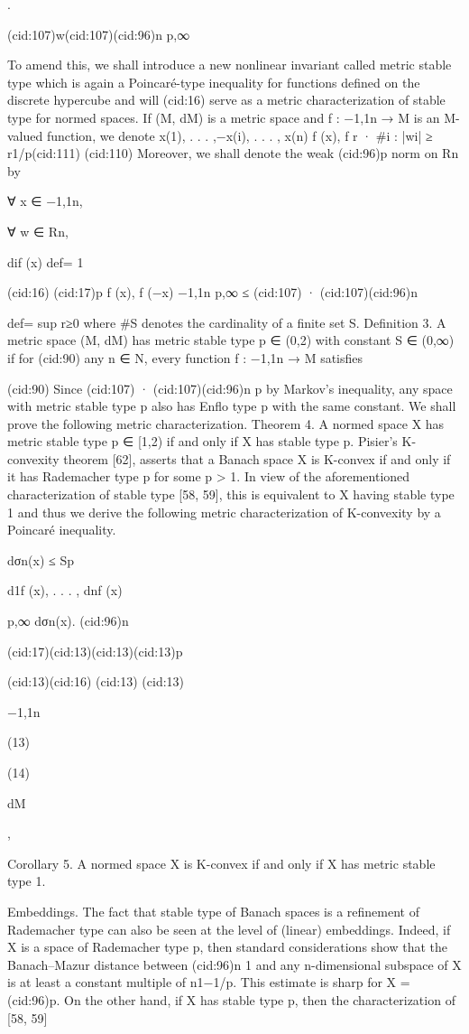 .

(cid:107)w(cid:107)(cid:96)n
p,∞

To amend this, we shall introduce a new nonlinear invariant called metric stable type which
is again a Poincaré-type inequality for functions deﬁned on the discrete hypercube and will
(cid:16)
serve as a metric characterization of stable type for normed spaces. If (M, dM) is a metric space
and f : {−1,1}n → M is an M-valued function, we denote
x(1), . . . ,−x(i), . . . , x(n)
f (x), f
r · #{i : |wi| ≥ r}1/p(cid:111)
(cid:110)
Moreover, we shall denote the weak (cid:96)p norm on Rn by

∀ x ∈ {−1,1}n,

∀ w ∈ Rn,

dif (x) def= 1

(cid:16)
(cid:17)p
f (x), f (−x)
{−1,1}n
p,∞ ≤ (cid:107) · (cid:107)(cid:96)n

def= sup
r≥0
where #S denotes the cardinality of a ﬁnite set S.
Deﬁnition 3. A metric space (M, dM) has metric stable type p ∈ (0,2) with constant S ∈ (0,∞) if for
(cid:90)
any n ∈ N, every function f : {−1,1}n → M satisﬁes

(cid:90)
Since (cid:107) · (cid:107)(cid:96)n
p by Markov’s inequality, any space with metric stable type p also has
Enﬂo type p with the same constant. We shall prove the following metric characterization.
Theorem 4. A normed space X has metric stable type p ∈ [1,2) if and only if X has stable type p.
Pisier’s K-convexity theorem [62], asserts that a Banach space X is K-convex if and only
if it has Rademacher type p for some p > 1. In view of the aforementioned characterization
of stable type [58, 59], this is equivalent to X having stable type 1 and thus we derive the
following metric characterization of K-convexity by a Poincaré inequality.

dσn(x) ≤ Sp

d1f (x), . . . , dnf (x)

p,∞ dσn(x).
(cid:96)n

(cid:17)(cid:13)(cid:13)(cid:13)p

(cid:13)(cid:16)
(cid:13)
(cid:13)

{−1,1}n

(13)

(14)

dM

,

Corollary 5. A normed space X is K-convex if and only if X has metric stable type 1.

Embeddings. The fact that stable type of Banach spaces is a reﬁnement of Rademacher type
can also be seen at the level of (linear) embeddings. Indeed, if X is a space of Rademacher type
p, then standard considerations show that the Banach–Mazur distance between (cid:96)n
1 and any
n-dimensional subspace of X is at least a constant multiple of n1−1/p. This estimate is sharp
for X = (cid:96)p. On the other hand, if X has stable type p, then the characterization of [58, 59]

